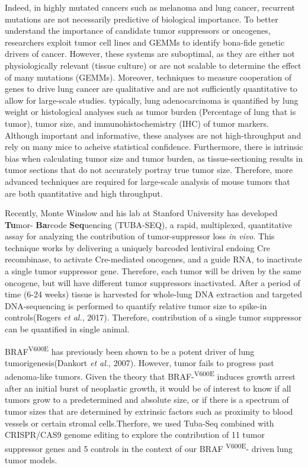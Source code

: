 Indeed, in highly mutated cancers such as melanoma and lung cancer, recurrent mutations are not necessarily predictive of biological importance. To better understand the importance of candidate tumor suppressors or oncogenes, researchers exploit tumor cell lines and GEMMs to identify bona-fide genetic drivers of cancer. However, these systems are suboptimal, as they are either not physiologically relevant (tissue culture) or are not scalable to determine the effect of many mutations (GEMMs). Moreover, techniques to measure cooperation of genes to drive lung cancer are qualitative and are not sufficiently quantitative to allow for large-scale studies. typically, lung adenocarcinoma is quantified by lung weight or histological analyses such as tumor burden (Percentage of lung that is tumor), tumor size, and immunohistochemistry (IHC) of tumor markers. Although important and informative, these analyses are not high-throughput and rely on many mice to acheive statistical confidence. Furthermore, there is intrinsic bias when calculating tumor size and tumor burden, as tissue-sectioning results in tumor sections that do not accurately portray true tumor size. Therefore, more advanced techniques are required for large-scale analysis of mouse tumors that are both quantitative and high throughput.

Recently, Monte Winslow and his lab at Stanford University has developed \textbf{Tu}mor- \textbf{Ba}rcode \textbf{Seq}uencing (TUBA-SEQ), a rapid, multiplexed, quantitative assay for analyzing the contribution of tumor-suppressor loss \emph{in vivo}. This technique works by delivering a uniquely barcoded lentiviral endoing Cre recombinase, to activate Cre-mediated oncogenes, and a guide RNA, to inactivate a single tumor suppressor gene. Therefore, each tumor will be driven by the same oncogene, but will have different tumor suppressors inactivated. After a period of time (6-24 weeks) tissue is harvested for whole-lung DNA extraction and targeted DNA-sequencing is performed to quantify relative tumor size to spike-in controls(Rogers \emph{et al.}, 2017). Therefore, contribution of a single tumor suppressor can be quantified in single animal.

BRAF\textsuperscript{V600E} has previously been shown to be a potent driver of lung tumorigenesis(Dankort \emph{et al.}, 2007). However, tumor fails to progress past adenoma-like tumors. Given the theory that BRAF-\textsuperscript{V600E} induces growth arrest after an initial burst of neoplastic growth, it would be of interest to know if all tumors grow to a predetermined and absolute size, or if there is a spectrum of tumor sizes that are determined by extrinsic factors such as proximity to blood vessels or certain stromal cells.Therfore, we used Tuba-Seq combined with CRISPR/CAS9 genome editing to explore the contribution of 11 tumor suppressor genes and 5 controls in the context of our BRAF \textsuperscript{V600E}- driven lung tumor models.

